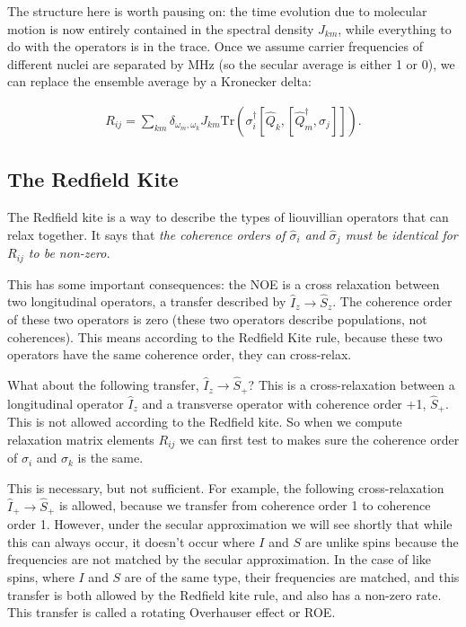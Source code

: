 \documentclass[notitlepage,11pt]{article}
\begin{document}
The structure here is worth pausing on: the time evolution due to molecular motion is now entirely contained in the spectral density $J_{km}$, while everything to do with the operators is in the trace. Once we assume carrier frequencies of different nuclei are separated by MHz (so the secular average is either 1 or 0), we can replace the ensemble average by a Kronecker delta:

\begin{equation}
\begin{array}{rl}
  R_{ij}= \sum_{km} \delta_{\omega_m,\omega_k}   J_{km}    \mathrm{Tr}\left(\sigma_i^\dagger  \left[\hat{Q}_k ,\left[\hat{Q}_m^\dagger,\sigma_j\right]\right]  \right).
\label{rate}
\end{array}
\end{equation}


\subsection{The Redfield Kite}

The Redfield kite is a way to describe the types of liouvillian operators that can relax together. It says that \emph{the coherence orders of $\hat{\sigma}_i$ and $\hat{\sigma}_j$ must be identical for $R_{ij}$ to be non-zero.}

This has some important consequences: the NOE is a cross relaxation between two longitudinal operators, a transfer described by $\hat{I}_z\rightarrow \hat{S}_{z}$. The coherence order of these two operators is zero (these two operators describe populations, not coherences). This means according to the Redfield Kite rule, because these two operators have the same coherence order, they can cross-relax.

What about the following transfer, $\hat{I}_z\rightarrow \hat{S}_+$? This is a cross-relaxation between a longitudinal operator $\hat{I}_z$ and a transverse operator with coherence order +1, $\hat{S}_+$. This is not allowed according to the Redfield kite. So when we compute relaxation matrix elements $R_{ij}$ we can first test to makes sure the coherence order of $\sigma_i$ and $\sigma_k$ is the same.

This is necessary, but not sufficient. For example, the following cross-relaxation $\hat{I}_+\rightarrow \hat{S}_+$ is allowed, because we transfer from coherence order 1 to coherence order 1. However, under the secular approximation we will see shortly that while this can always occur, it doesn't occur where $I$ and $S$ are unlike spins because the frequencies are not matched by the secular approximation. In the case of like spins, where $I$ and $S$ are of the same type, their frequencies are matched, and this transfer is both allowed by the Redfield kite rule, and also has a non-zero rate. This transfer is called a rotating Overhauser effect or ROE.
\end{document}
